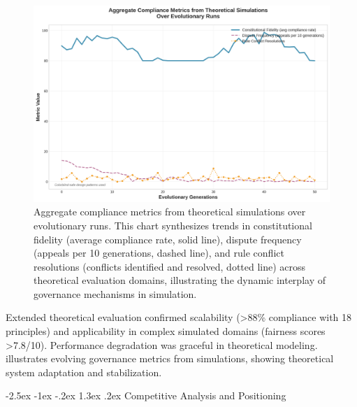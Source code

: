 \documentclass[manuscript,screen,9pt]{acmart}
\makeatletter
\renewcommand\section{\@startsection{section}{1}{\z@}%
  {-2.5ex \@plus -1ex \@minus -.2ex}%
  {1.3ex \@plus.2ex}%
  {\normalfont\Large\bfseries}}
\makeatother
\begin{document}
\FloatBarrier %
\begin{figure}[!htb]
	\centering
	\includegraphics[width=\linewidth,keepaspectratio]{figures/Figure_5_compliance_generations.png}
	\caption{Aggregate compliance metrics from theoretical simulations over evolutionary runs. This chart synthesizes trends in constitutional fidelity (average compliance rate, solid line), dispute frequency (appeals per 10 generations, dashed line), and rule conflict resolutions (conflicts identified and resolved, dotted line) across theoretical evaluation domains, illustrating the dynamic interplay of governance mechanisms in simulation.}
	\label{fig:compliance-trends}
\end{figure}

Extended theoretical evaluation confirmed scalability (>88\% compliance with 18 principles) and applicability in complex simulated domains (fairness scores >7.8/10). Performance degradation was graceful in theoretical modeling.  illustrates evolving governance metrics from simulations, showing theoretical system adaptation and stabilization.

\section{Competitive Analysis and Positioning}
\label{sec:competitive_analysis}
\end{document}
